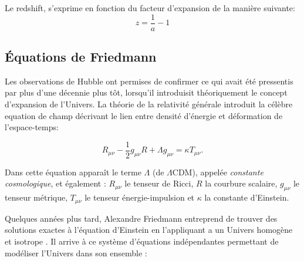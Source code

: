 Le redshift, s'exprime en fonction du facteur d'expansion de la manière suivante:
\begin{equation}
z= \frac{1}{a}-1
\end{equation}

\subsection{Équations de Friedmann}
\label{sec:friedman}

Les observations de Hubble ont permises de confirmer ce qui avait été pressentis par \cite{1916AnP...354..769E} plus d'une décennie plus tôt, lorsqu'il introduisit théoriquement le concept d'expansion de l'Univers. 
La théorie de la relativité générale introduit la célèbre equation de champ décrivant le lien entre densité d'énergie et déformation de l'espace-temps:

\begin{equation}
R_{\mu\nu} - \frac{1}{2} g_{\mu\nu}R + \Lambda g_{\mu\nu}  = \kappa T_{\mu\nu}.
\label{eq:einstein}
\end{equation} 

Dans cette équation apparaît le terme $\Lambda$ (de $\Lambda$CDM), appelée \textit{constante cosmologique}, et également :
$R_{\mu \nu}$ le tenseur de Ricci, $R$ la courbure scalaire, $g_{\mu \nu}$ le tenseur métrique, $T_{\mu \nu }$ le tenseur énergie-impulsion et $\kappa$ la constante d'Einstein.


Quelques années plus tard, Alexandre Friedmann entreprend de trouver des solutions exactes à l'équation d'Einstein en l'appliquant a un Univers homogène et isotrope \citep{1922ZPhy...10..377F}.
Il arrive à ce système d'équations indépendantes permettant de modéliser l'Univers dans son ensemble :

% 
%
% 
 
